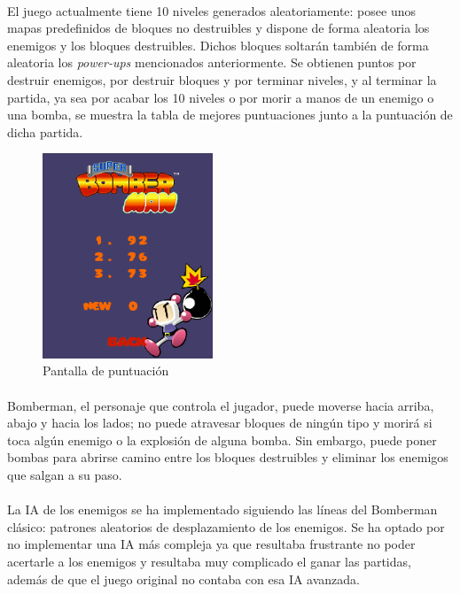 \documentclass[a4paper]{article}
\begin{document}
\paragraph{}El juego actualmente tiene 10 niveles generados aleatoriamente: posee unos mapas predefinidos de bloques no destruibles y dispone de forma aleatoria los enemigos y los bloques destruibles. Dichos bloques soltarán también de forma aleatoria los \textit{power-ups} mencionados anteriormente. Se obtienen puntos por destruir enemigos, por destruir bloques y por terminar niveles, y al terminar la partida, ya sea por acabar los 10 niveles o por morir a manos de un enemigo o una bomba, se muestra la tabla de mejores puntuaciones junto a la puntuación de dicha partida.
\begin{figure}[H]
	\centering
	\includegraphics[width=2in]{score.png}
	\caption{Pantalla de puntuación}
	\label{fig:score}
\end{figure}
\paragraph{}Bomberman, el personaje que controla el jugador, puede moverse hacia arriba, abajo y hacia los lados; no puede atravesar bloques de ningún tipo y morirá si toca algún enemigo o la explosión de alguna bomba. Sin embargo, puede poner bombas para abrirse camino entre los bloques destruibles y eliminar los enemigos que salgan a su paso.
\paragraph{}La IA de los enemigos se ha implementado siguiendo las líneas del Bomberman clásico: patrones aleatorios de desplazamiento de los enemigos. Se ha optado por no implementar una IA más compleja ya que resultaba frustrante no poder acertarle a los enemigos y resultaba muy complicado el ganar las partidas, además de que el juego original no contaba con esa IA avanzada.
\end{document}

